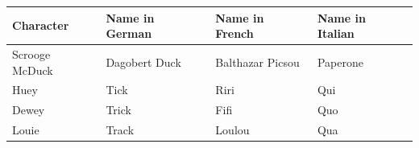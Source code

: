 \documentclass[11pt,a4paper]{article}
\begin{document}
\begin{table}[h]
\begin{tabular}{|l|l|l|l|}
\hline
Character & Name in German & Name in French & Name in Italian \\ \hline
Scrooge McDuck & Dagobert Duck & Balthazar Picsou & Paperone \\ \hline
Huey & Tick & Riri & Qui \\ \hline
Dewey & Trick & Fifi & Quo \\ \hline
Louie & Track & Loulou & Qua \\ \hline
\end{tabular}
\end{table}
\end{document}
